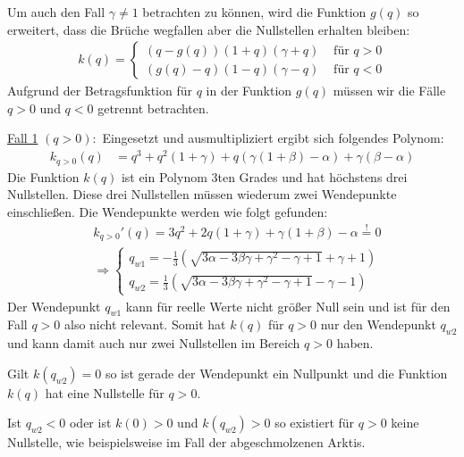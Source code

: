 \documentclass[a4paper,twoside]{article}
\begin{document}
	
	Um auch den Fall \(\gamma \neq 1\) betrachten zu können, wird die Funktion \(g(q)\) so erweitert, dass die Brüche wegfallen aber die Nullstellen erhalten bleiben:
	\begin{align*}
		k(q) = \left\{ \begin{array}{ll}
			\left( q - g\left(q\right) \right)(1 + q)(\gamma + q) &\textrm{ für } q > 0  \\
			\left( g\left(q\right) - q \right)(1 - q)(\gamma - q) &\textrm{ für } q < 0
		\end{array} \right.
	\end{align*}
	Aufgrund der Betragsfunktion für \(q\) in der Funktion \(g(q)\) müssen wir die Fälle \(q > 0\) und \(q < 0\) getrennt betrachten. 
	
	\noindent\underline{Fall 1} \((q > 0):\)
	\noindent Eingesetzt und ausmultipliziert ergibt sich folgendes Polynom:
	\begin{align*}
		k_{q>0}(q) &= q^3 + q^2(1 + \gamma) + q\left(\gamma \left(1 + \beta\right) - \alpha \right) + \gamma \left( \beta - \alpha \right)
	\end{align*}
	Die Funktion \(k(q)\) ist ein Polynom 3ten Grades und hat höchstens drei Nullstellen. Diese drei Nullstellen müssen wiederum zwei Wendepunkte einschließen. Die Wendepunkte werden wie folgt gefunden:
	\begin{align*}
		&k_{q>0}'(q) = 3q^2 + 2q(1+\gamma) + \gamma(1+\beta) - \alpha \stackrel{!}{=} 0 \\
		&\Rightarrow \left\{ \begin{array}{l}
			q_{w1} = -\frac{1}{3}\left( \sqrt{3\alpha - 3\beta\gamma + \gamma^2 - \gamma + 1} +\gamma + 1 \right) \\
			q_{w2} = \frac{1}{3}\left( \sqrt{3\alpha - 3\beta\gamma + \gamma^2 - \gamma + 1} -\gamma - 1 \right)
		\end{array} \right.
	\end{align*}
	Der Wendepunkt \(q_{w1}\) kann für reelle Werte nicht größer Null sein und ist für den Fall \(q > 0\) also nicht relevant. Somit hat \(k(q)\) für \(q > 0\) nur den Wendepunkt \(q_{w2}\) und kann damit auch nur zwei Nullstellen im Bereich \(q > 0\) haben.
	
	Gilt \(k(q_{w2}) = 0\) so ist gerade der Wendepunkt ein Nullpunkt und die Funktion \(k(q)\) hat eine Nullstelle für \(q > 0\).
	
	Ist \(q_{w2} < 0\) oder ist \(k(0) > 0\) und \(k(q_{w2}) > 0\) so existiert für \(q > 0\) keine Nullstelle, wie beispielsweise im Fall der abgeschmolzenen Arktis.
	
\end{document}
